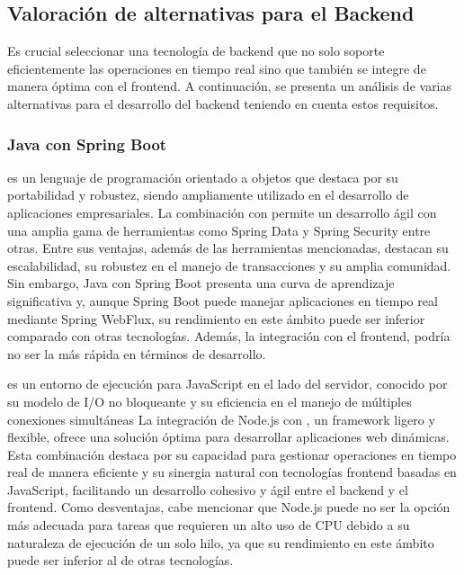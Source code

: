 \subsection{Valoración de alternativas para el Backend}
Es crucial seleccionar una tecnología de backend que no solo soporte eficientemente las operaciones en tiempo real sino que también se integre de manera óptima con el frontend.
A continuación, se presenta un análisis de varias alternativas para el desarrollo del backend teniendo en cuenta estos requisitos.

\subsubsection{Java con Spring Boot}
 es un lenguaje de programación orientado a objetos que destaca por su portabilidad y robustez, siendo ampliamente utilizado en el desarrollo de aplicaciones empresariales. 
La combinación con  permite un desarrollo ágil con una amplia gama de herramientas como Spring Data y Spring Security entre otras. 
Entre sus ventajas, además de las herramientas mencionadas, destacan su escalabilidad, su robustez en el manejo de transacciones y su amplia comunidad. 
Sin embargo, Java con Spring Boot presenta una curva de aprendizaje significativa y, aunque Spring Boot puede manejar aplicaciones en tiempo real mediante Spring WebFlux, su rendimiento en este ámbito puede ser inferior comparado con otras tecnologías. Además, la integración con el frontend, podría no ser la más rápida en términos de desarrollo.

 es un entorno de ejecución para JavaScript en el lado del servidor, conocido por su modelo de I/O no bloqueante y su eficiencia en el manejo de múltiples conexiones simultáneas
La integración de Node.js con , un framework ligero y flexible, ofrece una solución óptima para desarrollar aplicaciones web dinámicas.
Esta combinación destaca por su capacidad para gestionar operaciones en tiempo real de manera eficiente y su sinergia natural con tecnologías frontend basadas en JavaScript, facilitando un desarrollo cohesivo y ágil entre el backend y el frontend.
Como desventajas, cabe mencionar que Node.js puede no ser la opción más adecuada para tareas que requieren un alto uso de CPU debido a su naturaleza de ejecución de un solo hilo, ya que su rendimiento en este ámbito puede ser inferior al de otras tecnologías.

